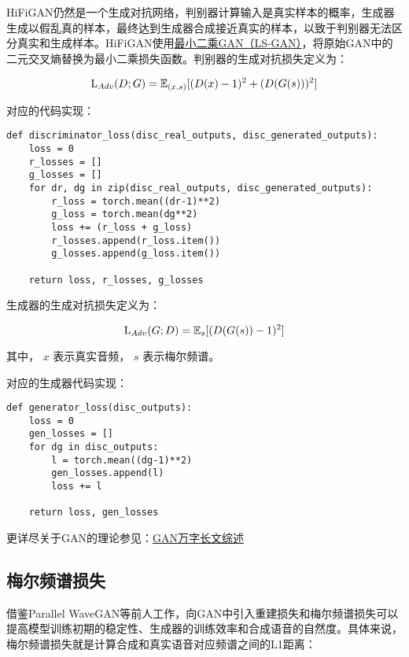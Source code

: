 \documentclass[cn,10pt,math=newtx,citestyle=gb7714-2015,bibstyle=gb7714-2015]{elegantbook}
\begin{document}
HiFiGAN仍然是一个生成对抗网络，判别器计算输入是真实样本的概率，生成器生成以假乱真的样本，最终达到生成器合成接近真实的样本，以致于判别器无法区分真实和生成样本。HiFiGAN使用\href{https://zhuanlan.zhihu.com/p/25768099}{最小二乘GAN（LS-GAN）}，将原始GAN中的二元交叉熵替换为最小二乘损失函数。判别器的生成对抗损失定义为：

\begin{equation}
  {\rm L}_{Adv}(D;G)=\mathbb{E}_{(x,s)}[(D(x)-1)^2+(D(G(s)))^2]
\end{equation}

对应的代码实现：

\begin{lstlisting}
def discriminator_loss(disc_real_outputs, disc_generated_outputs):
    loss = 0
    r_losses = []
    g_losses = []
    for dr, dg in zip(disc_real_outputs, disc_generated_outputs):
        r_loss = torch.mean((dr-1)**2)
        g_loss = torch.mean(dg**2)
        loss += (r_loss + g_loss)
        r_losses.append(r_loss.item())
        g_losses.append(g_loss.item())

    return loss, r_losses, g_losses
\end{lstlisting}

生成器的生成对抗损失定义为：

\begin{equation}
  {\rm L}_{Adv}(G;D)=\mathbb{E}_{s}[(D(G(s))-1)^2]
\end{equation}

其中， $x$ 表示真实音频， $s$ 表示梅尔频谱。

对应的生成器代码实现：

\begin{lstlisting}
def generator_loss(disc_outputs):
    loss = 0
    gen_losses = []
    for dg in disc_outputs:
        l = torch.mean((dg-1)**2)
        gen_losses.append(l)
        loss += l

    return loss, gen_losses
\end{lstlisting}

更详尽关于GAN的理论参见：\href{https://zhuanlan.zhihu.com/p/58812258}{GAN万字长文综述}

\subsection{梅尔频谱损失}

借鉴Parallel WaveGAN等前人工作，向GAN中引入重建损失和梅尔频谱损失可以提高模型训练初期的稳定性、生成器的训练效率和合成语音的自然度。具体来说，梅尔频谱损失就是计算合成和真实语音对应频谱之间的L1距离：
\end{document}
